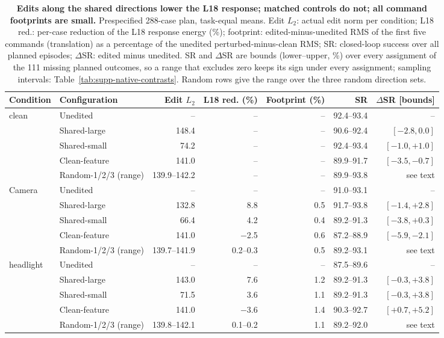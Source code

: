 \begin{table}[t]\centering\small
\caption{\textbf{Edits along the shared directions lower the L18 response; matched controls do not; all command footprints are small.} Prespecified 288-case plan, task-equal means. Edit $L_2$: actual edit norm per condition; L18 red.: per-case reduction of the L18 response energy (\%); footprint: edited-minus-unedited RMS of the first five commands (translation) as a percentage of the unedited perturbed-minus-clean RMS; SR: closed-loop success over all planned episodes; $\Delta$SR: edited minus unedited. SR and $\Delta$SR are bounds (lower--upper, \%) over every assignment of the 111 missing planned outcomes, so a range that excludes zero keeps its sign under every assignment; sampling intervals: Table~\ref{tab:supp-native-contrasts}. Random rows give the range over the three random direction sets.}
\label{tab:supp-native-ablation}
\begin{tabular}{llrrrrr}\toprule
Condition & Configuration & Edit $L_2$ & L18 red. (\%) & Footprint (\%) & SR & $\Delta$SR [bounds]\\
\midrule
clean & Unedited & -- & -- & -- & 92.4--93.4 & --\\
 & Shared-large & 148.4 & -- & -- & 90.6--92.4 & $[-2.8,0.0]$\\
 & Shared-small & 74.2 & -- & -- & 92.4--93.4 & $[-1.0,+1.0]$\\
 & Clean-feature & 141.0 & -- & -- & 89.9--91.7 & $[-3.5,-0.7]$\\
 & Random-1/2/3 (range) & 139.9--142.2 & -- & -- & 89.9--93.8 & see text\\
\midrule
Camera & Unedited & -- & -- & -- & 91.0--93.1 & --\\
 & Shared-large & 132.8 & 8.8 & 0.5 & 91.7--93.8 & $[-1.4,+2.8]$\\
 & Shared-small & 66.4 & 4.2 & 0.4 & 89.2--91.3 & $[-3.8,+0.3]$\\
 & Clean-feature & 141.0 & $-$2.5 & 0.6 & 87.2--88.9 & $[-5.9,-2.1]$\\
 & Random-1/2/3 (range) & 139.7--141.9 & 0.2--0.3 & 0.5 & 89.2--93.1 & see text\\
\midrule
headlight & Unedited & -- & -- & -- & 87.5--89.6 & --\\
 & Shared-large & 143.0 & 7.6 & 1.2 & 89.2--91.3 & $[-0.3,+3.8]$\\
 & Shared-small & 71.5 & 3.6 & 1.1 & 89.2--91.3 & $[-0.3,+3.8]$\\
 & Clean-feature & 141.0 & $-$3.6 & 1.4 & 90.3--92.7 & $[+0.7,+5.2]$\\
 & Random-1/2/3 (range) & 139.8--142.1 & 0.1--0.2 & 1.1 & 89.2--92.0 & see text\\\bottomrule
\end{tabular}
\end{table}

